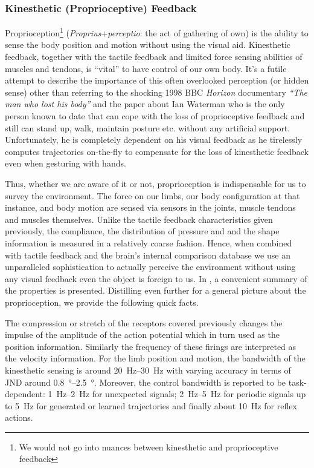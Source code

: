 \subsubsection{Kinesthetic (Proprioceptive) Feedback}
Proprioception\footnote{We would not go into nuances between kinesthetic and proprioceptive feedback} (\emph{Proprius}+\emph{perceptio}: the act of gathering of own) is the ability to sense the body position and motion without using the visual aid. Kinesthetic feedback, together with the tactile feedback and limited force sensing abilities of muscles and tendons, is ``vital'' to have control of our own body. It's a futile attempt to describe the importance of this often overlooked perception (or hidden sense) other than referring to the shocking 1998 BBC \emph{Horizon} documentary \emph{``The man who lost his body''} and the paper \cite{waterman} about Ian Waterman who is the only person known to date that can cope with the loss of proprioceptive feedback and still can stand up, walk, maintain posture etc. without any artificial support. Unfortunately, he is completely dependent on his visual feedback as he tirelessly computes trajectories  on-the-fly to compensate for the loss of kinesthetic feedback even when gesturing with hands. 

Thus, whether we are aware of it or not, proprioception is indispensable for us to survey the environment. The force on our limbs, our body configuration at that instance, and body motion are sensed via sensors in the joints, muscle tendons and muscles themselves. Unlike the tactile feedback characteristics given previously, the compliance, the distribution of pressure and and the shape information is measured in a relatively coarse fashion. Hence, when combined with tactile feedback and the brain's internal comparison database we use an unparalleled sophistication to actually perceive the environment without using any visual feedback even the object is foreign to us. In \cite{biggssrinivasan}, a convenient summary of the properties is presented. Distilling even further for a general picture about the proprioception, we provide the following quick facts. 

The compression or stretch of the receptors covered previously changes the impulse of the amplitude of the action potential which in turn used as the position information. Similarly the frequency of these firings are interpreted as the velocity information. For the limb position and motion, the bandwidth of the kinesthetic sensing is around \SIrange{20}{30}{\hertz} with varying accuracy in terms of JND around \SIrange{0.8}{2.5}{\degree}. Moreover, the control bandwidth is reported to be task-dependent: \SIrange{1}{2}{\hertz} for unexpected signals; \SIrange{2}{5}{\hertz} for periodic signals up to \SI{5}{\hertz} for generated or learned trajectories and finally about \SI{10}{\hertz} for reflex actions. 


